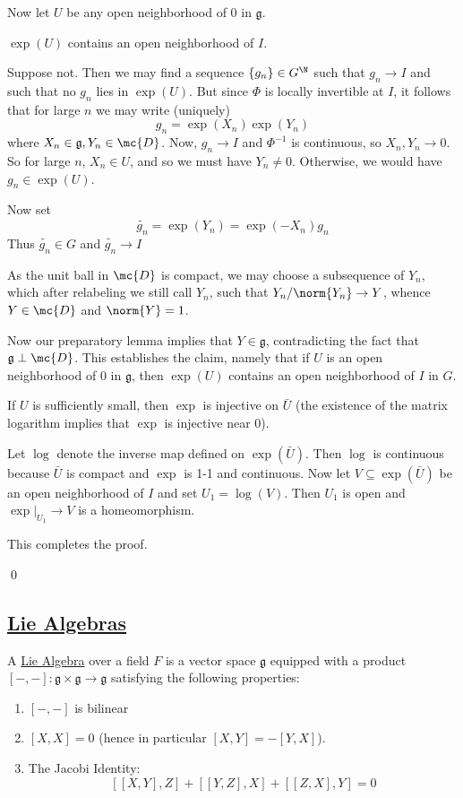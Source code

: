 \documentclass[x11names,reqno,14pt]{extarticle}
\newcommand{\mk}[1]{\mathfrak{#1}}
\newcommand{\g}{\mk{g}}
\begin{document}
Now let $U$ be any open neighborhood of $0$ in $\g$.

\claim

$\exp(U)$ contains an open neighborhood of $I$. 

\proof

Suppose not. Then we may find a sequence $\{g_n\} \in G^\N$ such that $g_n \to I$ and such that no $g_n$ lies in $\exp(U)$. But since $\Phi$ is locally invertible at $I$, it follows that for large $n$ we may write (uniquely) 
\[
g_n = \exp(X_n)\exp(Y_n)
\]
where $X_n\in\g, Y_n\in\mc{D}$. Now, $g_n\to I$ and $\Phi^{-1}$ is continuous, so $X_n, Y_n \to 0$. So for large $n$, $X_n \in U$, and so we must have $Y_n\neq0$. Otherwise, we would have $g_n \in \exp(U)$. 

Now set 
\[
\tilde{g_n} = \exp(Y_n)= \exp(-X_n)g_n
\]
Thus $\tilde{g_n} \in G$ and $\tilde{g_n}\to I$

As the unit ball in $\mc{D}$ is compact, we may choose a subsequence of $Y_n$, which after relabeling we still call $Y_n$, such that $Y_n/\norm{Y_n} \to Y$, whence $Y \in \mc{D}$ and $\norm{Y}=1$.

Now our preparatory lemma implies that $Y \in \g$, contradicting the fact that $\g \perp \mc{D}$. This establishes the claim, namely that if $U$ is an open neighborhood of 0 in $\g$, then $\exp(U)$ contains an open neighborhood of $I$ in $G$.

If $U$ is sufficiently small, then $\exp$ is injective on $\bar{U}$ (the existence of the matrix logarithm implies that $\exp$ is injective near 0). 

Let $\log$ denote the inverse map defined on $\exp(\bar{U})$. Then $\log$ is continuous because $\bar{U}$ is compact and $\exp$ is 1-1 and continuous. Now let $V \subseteq \exp(\bar{U})$ be an open neighborhood of $I$ and set $U_1 = \log(V)$. Then $U_1$ is open and $\exp|_{U_1}\to V$ is a homeomorphism. 

This completes the proof. 

\qed

\subsection*{\underline{Lie Algebras}}


A \underline{Lie Algebra} over a field $F$ is a vector space $\g$ equipped with a product $[-,-]:\g\times\g\to\g$ satisfying the following properties:

\begin{enumerate}

\item $[-,-]$ is bilinear

\item $[X,X]=0$ (hence in particular $[X,Y] = -[Y,X]$). 

\item The Jacobi Identity:
\[
[[X, Y], Z] + [[Y,Z],X] + [[Z,X],Y] = 0
\]

\end{enumerate}
\end{document}
